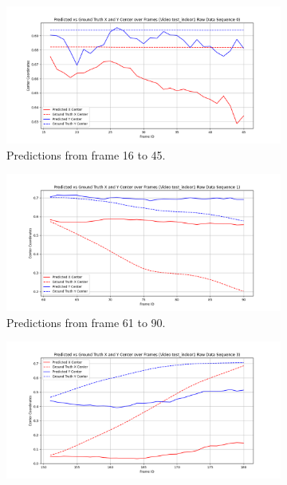 \documentclass[12pt,oneside]{book} %
\begin{document}
\begin{figure}[H]
    \centering
    \begin{subfigure}[t]{0.45\textwidth}
        \includegraphics[width=\textwidth]{figures/framework/test_indoor1 Raw Data - 0.png}
        \caption{Predictions from frame 16 to 45.}
        \label{fig:framework-test_indoor1-0}
    \end{subfigure}
    \hfill
    \begin{subfigure}[t]{0.45\textwidth}
        \includegraphics[width=\textwidth]{figures/framework/test_indoor1 Raw Data - 1.png}
        \caption{Predictions from frame 61 to 90.}
        \label{fig:framework-test_indoor1-1}
    \end{subfigure}
    \vfill
    \begin{subfigure}[t]{0.45\textwidth}
        \includegraphics[width=\textwidth]{figures/framework/test_indoor1 Raw Data - 3.png}

\end{subfigure}
\end{figure}
\end{document}
